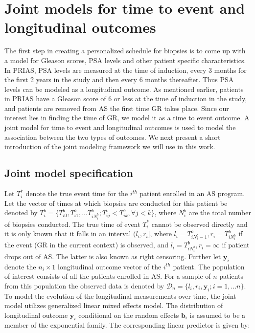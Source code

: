 
\section{Joint models for time to event and longitudinal outcomes}
\label{sec : jm_framework}
The first step in creating a personalized schedule for biopsies is to come up with a model for Gleason scores, PSA levels and other patient specific characteristics. In PRIAS, PSA levels are measured at the time of induction, every 3 months for the first 2 years in the study and then every 6 months thereafter. Thus PSA levels can be modeled as a longitudinal outcome. As mentioned earlier, patients in PRIAS have a Gleason score of 6 or less at the time of induction in the study, and patients are removed from AS the first time GR takes place. Since our interest lies in finding the time of GR, we model it as a time to event outcome. A joint model for time to event and longitudinal outcomes is used to model the association between the two types of outcomes. We next present a short introduction of the joint modeling framework we will use in this work.

\subsection{Joint model specification}
\label{subsec : jm_specification}
Let $T_i^*$ denote the true event time for the $i^{th}$ patient enrolled in an AS program. Let the vector of times at which biopsies are conducted for this patient be denoted by $T_i^b = \{T^b_{i0}, T^b_{i1}, \ldots T^b_{i{N_i^b}}; T^b_{ij} < T^b_{ik}, \forall j<k\}$, where $N_i^b$ are the total number of biopsies conducted. The true time of event $T_i^*$ cannot be observed directly and it is only known that it falls in an interval $(l_i, r_i]$, where $l_i = T^b_{i{N_i^b - 1}}, r_i = T^b_{i{N_i^b}}$ if the event (GR in the current context) is observed, and $l_i = T^b_{i{N_i^b}}, r_i=\infty$ if patient drops out of AS. The latter is also known as right censoring. Further let $\boldsymbol{y}_i$ denote the $n_i \times 1$ longitudinal outcome vector of the $i^{th}$ patient. The population of interest consists of all the patients enrolled in AS. For a sample of $n$ patients from this population the observed data is denoted by $\mathcal{D}_n = \{l_i, r_i, \boldsymbol{y}_i; i = 1, \ldots n\}$.\\

To model the evolution of the longitudinal measurements over time, the joint model utilizes generalized linear mixed effects model. The distribution of longitudinal outcome $\boldsymbol{y}_i$ conditional on the random effects $\boldsymbol{b}_i$ is assumed to be a member of the exponential family. The corresponding linear predictor is given by:

